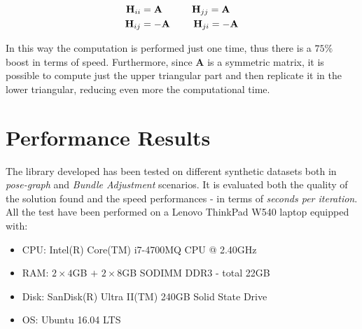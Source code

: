 \begin{align*}
    \mathbf{H}_{ii} &= \mathbf{A} \quad\qquad
    \mathbf{H}_{jj} = \mathbf{A} \\
    \mathbf{H}_{ij} &= -\mathbf{A} \:\,\qquad
    \mathbf{H}_{ji} = -\mathbf{A}
\end{align*}

\noindent In this way the computation is performed just one time, thus there is a $75\%$ boost in terms of speed. Furthermore, since $\mathbf{A}$ is a symmetric matrix, it is possible to compute just the upper triangular part and then replicate it in the lower triangular, reducing even more the computational time.

\section{Performance Results}\label{sec:performance_results}
The library developed has been tested on different synthetic datasets both in \textit{pose-graph} and \textit{Bundle Adjustment} scenarios. It is evaluated both the quality of the solution found and the speed performances - in terms of \textit{seconds per iteration}. All the test have been performed on a Lenovo ThinkPad W540 laptop equipped with:

\begin{itemize}
    \item CPU: Intel(R) Core(TM) i7-4700MQ CPU @ 2.40GHz
    \item RAM: $2 \times 4$GB $+$ $2\times8$GB SODIMM DDR3 - total 22GB
    \item Disk: SanDisk(R) Ultra II(TM) 240GB Solid State Drive
    \item OS: Ubuntu 16.04 LTS
\end{itemize}

